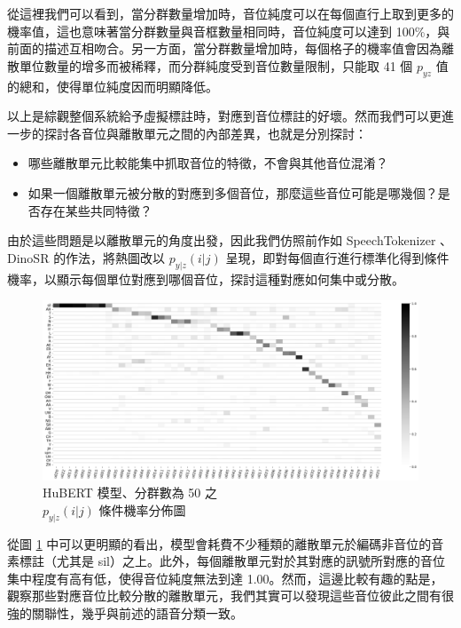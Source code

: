         從這裡我們可以看到，當分群數量增加時，音位純度可以在每個直行上取到更多的機率值，這也意味著當分群數量與音框數量相同時，音位純度可以達到 100\%，與前面的描述互相吻合。另一方面，當分群數量增加時，每個格子的機率值會因為離散單位數量的增多而被稀釋，而分群純度受到音位數量限制，只能取 41 個 $p_{yz}$ 值的總和，使得單位純度因而明顯降低。

        以上是綜觀整個系統給予虛擬標註時，對應到音位標註的好壞。然而我們可以更進一步的探討各音位與離散單元之間的內部差異，也就是分別探討：
\begin{itemize}
    \item 哪些離散單元比較能集中抓取音位的特徵，不會與其他音位混淆？
    \item 如果一個離散單元被分散的對應到多個音位，那麼這些音位可能是哪幾個？是否存在某些共同特徵？
\end{itemize}

        由於這些問題是以離散單元的角度出發，因此我們仿照前作如 SpeechTokenizer \cite{zhang2024speechtokenizer}、DinoSR \cite{liu2024dinosr} 的作法，將熱圖改以 $p_{y|z}(i|j)$ 呈現，即對每個直行進行標準化得到條件機率，以顯示每個單位對應到哪個音位，探討這種對應如何集中或分散。

\begin{figure}
    \centering
    \includegraphics[width=1\linewidth]{figures/11111111.png}
    \caption{HuBERT 模型、分群數為 50 之\\
$p_{y|z}(i|j)$  條件機率分佈圖}
    \label{fig:hubert-50-givenunit-byprob}
\end{figure}
        從圖 \ref{fig:hubert-50-givenunit-byprob} 中可以更明顯的看出，模型會耗費不少種類的離散單元於編碼非音位的音素標註（尤其是 sil）之上。此外，每個離散單元對於其對應的訊號所對應的音位集中程度有高有低，使得音位純度無法到達 1.00。然而，這邊比較有趣的點是，觀察那些對應音位比較分散的離散單元，我們其實可以發現這些音位彼此之間有很強的關聯性，幾乎與前述的語音分類一致。  %


